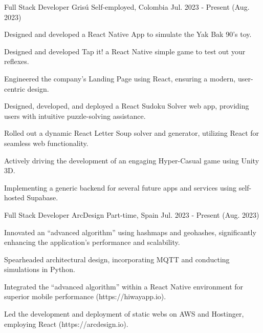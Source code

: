 \newcommand{\quotes}[1]{``#1''}

\begin{cventries}

  \cventry
  {Full Stack Developer} %
  {Grisú} %
  {Self-employed, Colombia} %
  {Jul. 2023 - Present (Aug. 2023)} %
  {
    \begin{cvitems} %
      \item {Designed and developed a React Native App to simulate the Yak Bak 90's toy.}
      \item \item {Designed and developed Tap it! a React Native simple game to test out your reflexes.}
      \item {Engineered the company's Landing Page using React, ensuring a modern, user-centric design.}
      \item {Designed, developed, and deployed a React Sudoku Solver web app, providing users with intuitive puzzle-solving assistance.}
      \item {Rolled out a dynamic React Letter Soup solver and generator, utilizing React for seamless web functionality.}
      \item {Actively driving the development of an engaging Hyper-Casual game using Unity 3D.}
      \item {Implementing a generic backend for several future apps and services using self-hosted Supabase.}
    \end{cvitems}
  }

  \cventry
  {Full Stack Developer} %
  {ArcDesign} %
  {Part-time, Spain} %
  {Jul. 2023 - Present (Aug. 2023)} %
  {
    \begin{cvitems} %
      \item {Innovated an \quotes{advanced algorithm} using hashmaps and geohashes, significantly enhancing the application's performance and scalability.}
      \item {Spearheaded architectural design, incorporating MQTT and conducting simulations in Python.}
      \item {Integrated the \quotes{advanced algorithm} within a React Native environment for superior mobile performance (https://hiwayapp.io).}
      \item {Led the development and deployment of static webs on AWS and Hostinger, employing React (https://arcdesign.io).}
    \end{cvitems}
  }


\end{cventries}
